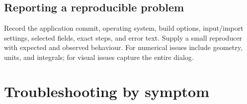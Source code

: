 \begin{samepage}
\section{Reporting a reproducible problem}
Record the application commit, operating system, build options, input/import settings, selected fields, exact steps, and error text. Supply a small reproducer with expected and observed behaviour. For numerical issues include geometry, units, and integrals; for visual issues capture the entire dialog.
\end{samepage}

\section{Troubleshooting by symptom}
\begingroup\small
